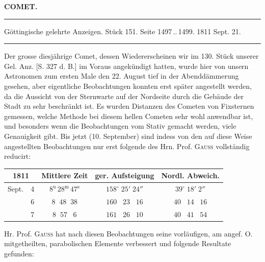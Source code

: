 \clearpage{}\hypertarget{native-342-lower}{}\label{native-342-lower}
\begin{center}\textbf{COMET.}\par\vspace{4pt}\hrule\vspace{4pt}\fontsize{10}{12}\selectfont Göttingische gelehrte Anzeigen. Stück 151. Seite 1497\,..\,1499. 1811 Sept. 21.\par\vspace{4pt}\hrule\vspace{4pt}\end{center}

\par\indent Der grosse diesjährige Comet, dessen Wiedererscheinen wir im 130. Stück unserer Gel. Anz. [S. 327 d. B.] im Voraus angekündigt hatten, wurde hier von unsern Astronomen zum ersten Male den 22. August tief in der Abenddämmerung gesehen, aber eigentliche Beobachtungen konnten erst später angestellt werden, da die Aussicht von der Sternwarte auf der Nordseite durch die Gebäude der Stadt zu sehr beschränkt ist. Es wurden Distanzen des Cometen von Fixsternen gemessen, welche Methode bei diesem hellen Cometen sehr wohl anwendbar ist, und besonders wenn die Beobachtungen vom Stativ gemacht werden, viele Genauigkeit gibt. Bis jetzt (10. September) sind indess von den auf diese Weise angestellten Beobachtungen nur erst folgende des Hrn. Prof. \textsc{Gauss} vollständig reducirt:

\begin{center}\fontsize{10}{12}\selectfont\setlength{\tabcolsep}{4pt}\renewcommand{\arraystretch}{1.15}\begin{tabular}{ll|c|c|c}
\multicolumn{2}{c|}{1811} & Mittlere Zeit & ger. Aufsteigung & Nordl. Abweich. \\\hline
Sept. & 4 & $8^{\mathrm u}\,28^{\mathrm m}\,47^{\mathrm s}$ & $158^\circ\;25'\;24''$ & $39^\circ\;18'\;2''$ \\
 & 6 & $8\;\;48\;\;38$ & $160\;\;\;23\;\;\;16$ & $40\;\;\;14\;\;\;16$ \\
 & 7 & $8\;\;57\;\;\;6$ & $161\;\;\;26\;\;\;10$ & $40\;\;\;41\;\;\;54$ \\
\end{tabular}
\end{center}

\par\indent Hr. Prof. \textsc{Gauss} hat nach diesen Beobachtungen seine vorläufigen, am angef. O. mitgetheilten, parabolischen Elemente verbessert und folgende Resultate gefunden:

